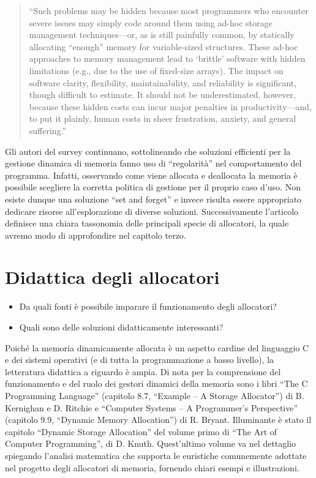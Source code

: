 \begin{quote}
``Such problems may be hidden because most programmers who encounter severe issues may simply code around them using ad-hoc storage management techniques---or, as is still painfully common, by statically allocating ``enough'' memory for variable-sized structures. These ad-hoc approaches to memory management lead to `brittle' software with hidden limitations (e.g., due to the use of fixed-size arrays). The impact on software clarity, flexibility, maintainability, and reliability is significant, though difficult to estimate. It should not be underestimated, however, because these hidden costs can incur major penalties in productivity---and, to put it plainly, human costs in sheer frustration, anxiety, and general suffering.''
\end{quote}

Gli autori del survey continuano, sottolineando che soluzioni efficienti per la gestione dinamica di memoria fanno uso di ``regolarità'' nel comportamento del programma. Infatti, osservando come viene allocata e deallocata la memoria è possibile scegliere la corretta politica di gestione per il proprio caso d’uso. Non esiste dunque una soluzione ``set and forget'' e invece risulta essere appropriato dedicare risorse all’esplorazione di diverse soluzioni. Successivamente l’articolo definisce una chiara tassonomia delle principali specie di allocatori, la quale avremo modo di approfondire nel capitolo terzo.

\section{Didattica degli allocatori}

\begin{itemize}
  \item Da quali fonti è possibile imparare il funzionamento degli allocatori?
  \item Quali sono delle soluzioni didatticamente interessanti?
\end{itemize}

Poiché la memoria dinamicamente allocata è un aspetto cardine del linguaggio C e dei sistemi operativi (e di tutta la programmazione a basso livello), la letteratura didattica a riguardo è ampia. Di nota per la comprensione del funzionamento e del ruolo dei gestori dinamici della memoria sono i libri ``The C Programming Language'' (capitolo 8.7, ``Example – A Storage Allocator'') di B. Kernighan e D. Ritchie e ``Computer Systems – A Programmer’s Perspective'' (capitolo 9.9, ``Dynamic Memory Allocation'') di R. Bryant. Illuminante è stato il capitolo ``Dynamic Storage Allocation'' del volume primo di ``The Art of Computer Programming'', di D. Knuth. Quest’ultimo volume va nel dettaglio spiegando l’analisi matematica che supporta le euristiche comunemente adottate nel progetto degli allocatori di memoria, fornendo chiari esempi e illustrazioni.

